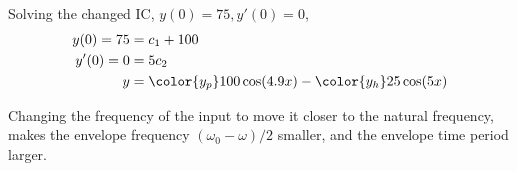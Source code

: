 \begin{enumerate}
          Solving the changed IC, $ y(0) = 75, y'(0) = 0 $,
          \begin{align}
              y(0) = 75 & = c_{1} + 100                  \\
              y'(0) = 0 & = 5c_{2}                       \\
              y         & = {\color{y_p} 100\cos(4.9x) }
              - {\color{y_h} 25\cos(5x)}
          \end{align}

          \begin{figure}[H]
              \centering
          \end{figure}
          \par
          Changing the frequency of the input to move it closer to the natural frequency,
          makes the envelope frequency $ (\omega_{0} - \omega)/2 $ smaller, and the
          envelope time period larger.


\end{enumerate}
